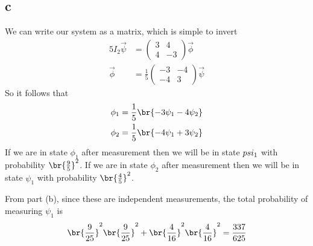 \subsection*{c}
We can write our system as a matrix, which is simple to invert
\begin{equation}
    \begin{split}
        5I_2\vec{\psi} &= \begin{pmatrix}
            3 & 4\\
            4 & -3
        \end{pmatrix}\vec{\phi}\\
        \vec{\phi}&=\frac{1}{5}\begin{pmatrix}
            -3 & -4\\
            -4 & 3
        \end{pmatrix}\vec{\psi}
    \end{split}
\end{equation}
So it follows that
\begin{equation}
    \begin{split}
        \phi_1 &= \frac{1}{5}\br{-3\psi_1-4\psi_2}\\
        \phi_2 &= \frac{1}{5}\br{-4\psi_1+3\psi_2}
    \end{split}
\end{equation}
If we are in state $\phi_1$ after measurement then we will be in state $\\psi_1$ with probability $\br{\frac{9}{5}}^2$. If we are in state $\phi_2$ after measurement then we will be in state $\psi_1$ with probability $\br{\frac{4}{5}}^2$.

From part (b), since these are independent measurements, the total probability of measuring $\psi_1$ is
\begin{equation}
    \br{\frac{9}{25}}^2    \br{\frac{9}{25}}^2+    \br{\frac{4}{16}}^2    \br{\frac{4}{16}}^2=\frac{337}{625}
\end{equation}